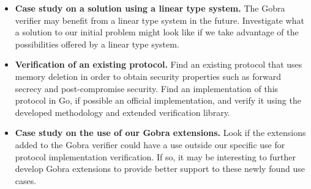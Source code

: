 \documentclass{article}
\begin{document}
\begin{itemize}
      \item \textbf{Case study on a solution using a linear type system.} The Gobra verifier may benefit from a linear type system in the future. Investigate what a solution to our initial problem might look like if we take advantage of the possibilities offered by a linear type system.
      \item \textbf{Verification of an existing protocol.} Find an existing protocol that uses memory deletion in order to obtain security properties such as forward secrecy and post-compromise security. Find an implementation of this protocol in Go, if possible an official implementation, and verify it using the developed methodology and extended verification library.
      \item \textbf{Case study on the use of our Gobra extensions.} Look if the extensions added to the Gobra verifier could have a use outside our specific use for protocol implementation verification. If so, it may be interesting to further develop Gobra extensions to provide better support to these newly found use cases.
\end{itemize}





\end{document}
